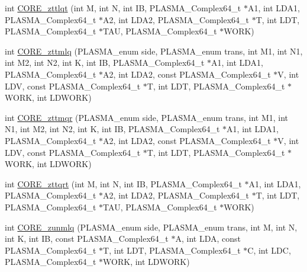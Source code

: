 \begin{DoxyCompactItemize}
\item 
int \hyperlink{group__CORE__PLASMA__Complex64__t_ga051b72e7693018f423a9219f8c121dd1_ga051b72e7693018f423a9219f8c121dd1}{C\+O\+R\+E\+\_\+zttlqt} (int M, int N, int I\+B, P\+L\+A\+S\+M\+A\+\_\+\+Complex64\+\_\+t $\ast$A1, int L\+D\+A1, P\+L\+A\+S\+M\+A\+\_\+\+Complex64\+\_\+t $\ast$A2, int L\+D\+A2, P\+L\+A\+S\+M\+A\+\_\+\+Complex64\+\_\+t $\ast$T, int L\+D\+T, P\+L\+A\+S\+M\+A\+\_\+\+Complex64\+\_\+t $\ast$T\+A\+U, P\+L\+A\+S\+M\+A\+\_\+\+Complex64\+\_\+t $\ast$W\+O\+R\+K)
\item 
int \hyperlink{group__CORE__PLASMA__Complex64__t_ga7e238da51e9a32b49dd03ec34ea1610b_ga7e238da51e9a32b49dd03ec34ea1610b}{C\+O\+R\+E\+\_\+zttmlq} (P\+L\+A\+S\+M\+A\+\_\+enum side, P\+L\+A\+S\+M\+A\+\_\+enum trans, int M1, int N1, int M2, int N2, int K, int I\+B, P\+L\+A\+S\+M\+A\+\_\+\+Complex64\+\_\+t $\ast$A1, int L\+D\+A1, P\+L\+A\+S\+M\+A\+\_\+\+Complex64\+\_\+t $\ast$A2, int L\+D\+A2, const P\+L\+A\+S\+M\+A\+\_\+\+Complex64\+\_\+t $\ast$V, int L\+D\+V, const P\+L\+A\+S\+M\+A\+\_\+\+Complex64\+\_\+t $\ast$T, int L\+D\+T, P\+L\+A\+S\+M\+A\+\_\+\+Complex64\+\_\+t $\ast$W\+O\+R\+K, int L\+D\+W\+O\+R\+K)
\item 
int \hyperlink{group__CORE__PLASMA__Complex64__t_ga8ec319abdc289c1d748d831e6f3e25b3_ga8ec319abdc289c1d748d831e6f3e25b3}{C\+O\+R\+E\+\_\+zttmqr} (P\+L\+A\+S\+M\+A\+\_\+enum side, P\+L\+A\+S\+M\+A\+\_\+enum trans, int M1, int N1, int M2, int N2, int K, int I\+B, P\+L\+A\+S\+M\+A\+\_\+\+Complex64\+\_\+t $\ast$A1, int L\+D\+A1, P\+L\+A\+S\+M\+A\+\_\+\+Complex64\+\_\+t $\ast$A2, int L\+D\+A2, const P\+L\+A\+S\+M\+A\+\_\+\+Complex64\+\_\+t $\ast$V, int L\+D\+V, const P\+L\+A\+S\+M\+A\+\_\+\+Complex64\+\_\+t $\ast$T, int L\+D\+T, P\+L\+A\+S\+M\+A\+\_\+\+Complex64\+\_\+t $\ast$W\+O\+R\+K, int L\+D\+W\+O\+R\+K)
\item 
int \hyperlink{group__CORE__PLASMA__Complex64__t_ga9693c3912b0e461fd4a90773ad5481a8_ga9693c3912b0e461fd4a90773ad5481a8}{C\+O\+R\+E\+\_\+zttqrt} (int M, int N, int I\+B, P\+L\+A\+S\+M\+A\+\_\+\+Complex64\+\_\+t $\ast$A1, int L\+D\+A1, P\+L\+A\+S\+M\+A\+\_\+\+Complex64\+\_\+t $\ast$A2, int L\+D\+A2, P\+L\+A\+S\+M\+A\+\_\+\+Complex64\+\_\+t $\ast$T, int L\+D\+T, P\+L\+A\+S\+M\+A\+\_\+\+Complex64\+\_\+t $\ast$T\+A\+U, P\+L\+A\+S\+M\+A\+\_\+\+Complex64\+\_\+t $\ast$W\+O\+R\+K)
\item 
int \hyperlink{group__CORE__PLASMA__Complex64__t_gad485e97c4851dbf2437e4255f627023a_gad485e97c4851dbf2437e4255f627023a}{C\+O\+R\+E\+\_\+zunmlq} (P\+L\+A\+S\+M\+A\+\_\+enum side, P\+L\+A\+S\+M\+A\+\_\+enum trans, int M, int N, int K, int I\+B, const P\+L\+A\+S\+M\+A\+\_\+\+Complex64\+\_\+t $\ast$A, int L\+D\+A, const P\+L\+A\+S\+M\+A\+\_\+\+Complex64\+\_\+t $\ast$T, int L\+D\+T, P\+L\+A\+S\+M\+A\+\_\+\+Complex64\+\_\+t $\ast$C, int L\+D\+C, P\+L\+A\+S\+M\+A\+\_\+\+Complex64\+\_\+t $\ast$W\+O\+R\+K, int L\+D\+W\+O\+R\+K)

\end{DoxyCompactItemize}
